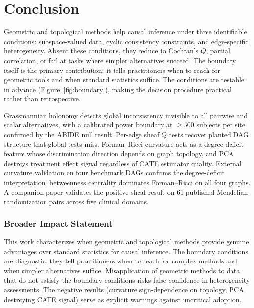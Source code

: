 \documentclass[11pt]{article}
\begin{document}
\section{Conclusion}
\label{sec:conclusion}

Geometric and topological methods help causal inference under three identifiable conditions: subspace-valued data, cyclic consistency constraints, and edge-specific heterogeneity.
Absent these conditions, they reduce to Cochran's $Q$, partial correlation, or fail at tasks where simpler alternatives succeed.
The boundary itself is the primary contribution: it tells practitioners when to reach for geometric tools and when standard statistics suffice.
The conditions are testable in advance (Figure~\ref{fig:boundary}), making the decision procedure practical rather than retrospective.

Grassmannian holonomy detects global inconsistency invisible to all pairwise and scalar alternatives, with a calibrated power boundary at $\geq 500$ subjects per site confirmed by the ABIDE null result.
Per-edge sheaf $Q$ tests recover planted DAG structure that global tests miss.
Forman--Ricci curvature acts as a degree-deficit feature whose discrimination direction depends on graph topology, and PCA destroys treatment effect signal regardless of CATE estimator quality.
External curvature validation on four benchmark DAGs confirms the degree-deficit interpretation: betweenness centrality dominates Forman--Ricci on all four graphs.
A companion paper \citep{tower2026sheaf} validates the positive sheaf result on 61 published Mendelian randomization pairs across five clinical domains.

\subsubsection*{Broader Impact Statement}
This work characterizes when geometric and topological methods provide genuine advantages over standard statistics for causal inference. The boundary conditions are diagnostic: they tell practitioners when to reach for complex methods and when simpler alternatives suffice. Misapplication of geometric methods to data that do not satisfy the boundary conditions risks false confidence in heterogeneity assessments. The negative results (curvature sign-dependence on topology, PCA destroying CATE signal) serve as explicit warnings against uncritical adoption.
\end{document}
